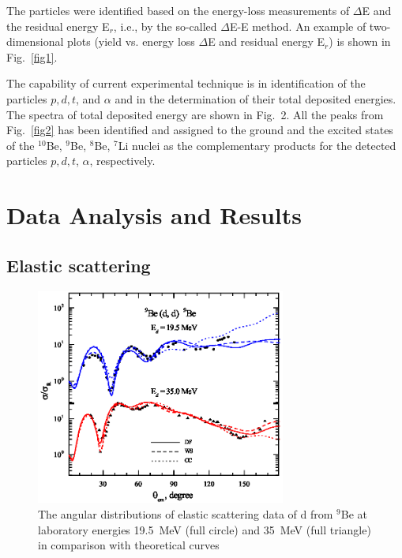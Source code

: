 \documentclass[10pt]{iopart}
\begin{document}
 The particles were identified based on the energy-loss measurements of $\Delta$E and the residual energy E$_r$, i.e., by the so-called $\Delta$E-E method. 
	An example of two-dimensional plots (yield vs. energy loss $\Delta$E and residual energy E$_r$) is shown in Fig.~\ref{fig1}.

The capability of current experimental technique is in identification of the particles $p, d, t$, and $\alpha$ and in the determination of their total deposited energies. The spectra of total deposited energy are shown in Fig.~2. All the peaks from Fig.~\ref{fig2} has been identified and assigned to the ground and the excited states of the $^{10}$Be, $^9$Be, $^8$Be, $^7$Li nuclei as the complementary products for the detected particles $p, d, t$, $\alpha$, respectively.





\section{Data Analysis and Results }
\subsection{Elastic scattering}


\begin{figure}[tp]
\centering
\includegraphics[width=8.2cm]{2H9BE.eps}
\caption{ \label{2H9BE}  \footnotesize The angular distributions of elastic scattering data of d from $^9$Be at laboratory energies 19.5~MeV (full circle) and 35~MeV (full triangle) in comparison with theoretical curves }
\end{figure}
\end{document}
